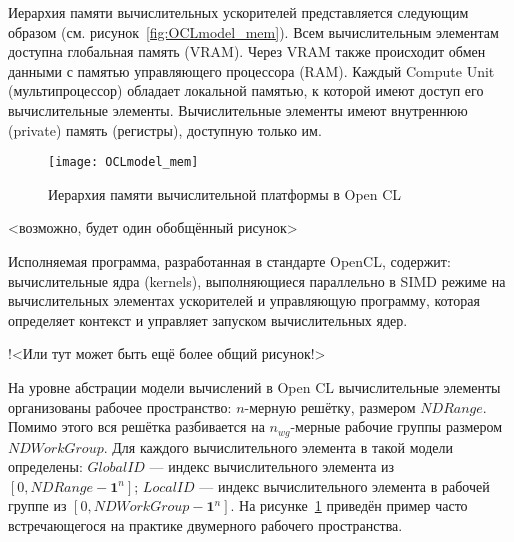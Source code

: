 Иерархия памяти вычислительных ускорителей представляется следующим образом
(см. рисунок~\ref{fig:OCLmodel_mem}).
Всем вычислительным элементам доступна глобальная память (VRAM).
Через VRAM также происходит обмен данными с памятью управляющего процессора (RAM). 
Каждый Compute Unit (мультипроцессор) обладает локальной памятью, к которой имеют доступ
его вычислительные элементы.
Вычислительные элементы имеют внутреннюю (private) память (регистры), доступную только им.

\begin{figure}[h!]
  \centering
  \texttt{[image: OCLmodel\_mem]} 
  \caption{Иерархия памяти вычислительной платформы в Open CL}
  \label{fig:OCL_wg}
\end{figure}
\FloatBarrier

<возможно, будет один обобщённый рисунок>

Исполняемая программа, разработанная в стандарте OpenCL,
содержит:  
вычислительные ядра (kernels), выполняющиеся
параллельно 
в SIMD режиме 
на вычислительных элементах ускорителей
и управляющую программу, которая
определяет контекст и 
управляет запуском вычислительных ядер.

!<Или тут может быть ещё более общий рисунок!>



На уровне абстрации модели вычислений в Open CL
вычислительные элементы организованы рабочее пространство:
$n$-мерную решётку,
размером $NDRange$.
Помимо этого вся решётка разбивается на $n_{wg}$-мерные рабочие группы
размером $NDWorkGroup$. 
Для каждого вычислительного элемента в такой модели определены:  
$GlobalID$ %
--- индекс вычислительного элемента из $[0, NDRange - \mathbf{1}^n]$;
$LocalID$ --- индекс вычислительного элемента в рабочей группе
из $[0, NDWorkGroup - \mathbf{1}^n]$. 
На рисунке~\ref{fig:OCL_wg} приведён пример
часто встречающегося на практике двумерного рабочего пространства.

